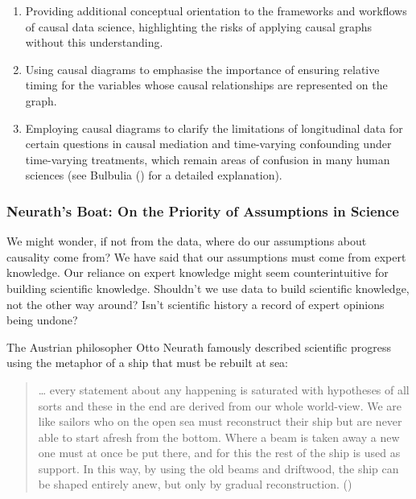 \documentclass[
  single column]{article}
\providecommand{\tightlist}{%
  \setlength{\itemsep}{0pt}\setlength{\parskip}{0pt}}\usepackage{longtable,booktabs,array}
\begin{document}
\begin{enumerate}
\def\labelenumi{\arabic{enumi}.}
\tightlist
\item
  Providing additional conceptual orientation to the frameworks and
  workflows of causal data science, highlighting the risks of applying
  causal graphs without this understanding.
\item
  Using causal diagrams to emphasise the importance of ensuring relative
  timing for the variables whose causal relationships are represented on
  the graph.
\item
  Employing causal diagrams to clarify the limitations of longitudinal
  data for certain questions in causal mediation and time-varying
  confounding under time-varying treatments, which remain areas of
  confusion in many human sciences (see Bulbulia
  () for a detailed
  explanation).
\end{enumerate}

\subsubsection{Neurath's Boat: On the Priority of Assumptions in
Science}\label{neuraths-boat-on-the-priority-of-assumptions-in-science}

We might wonder, if not from the data, where do our assumptions about
causality come from? We have said that our assumptions must come from
expert knowledge. Our reliance on expert knowledge might seem
counterintuitive for building scientific knowledge. Shouldn't we use
data to build scientific knowledge, not the other way around? Isn't
scientific history a record of expert opinions being undone?

The Austrian philosopher Otto Neurath famously described scientific
progress using the metaphor of a ship that must be rebuilt at sea:

\begin{quote}
\ldots{} every statement about any happening is saturated with
hypotheses of all sorts and these in the end are derived from our whole
world-view. We are like sailors who on the open sea must reconstruct
their ship but are never able to start afresh from the bottom. Where a
beam is taken away a new one must at once be put there, and for this the
rest of the ship is used as support. In this way, by using the old beams
and driftwood, the ship can be shaped entirely anew, but only by gradual
reconstruction. ()
\end{quote}
\end{document}
